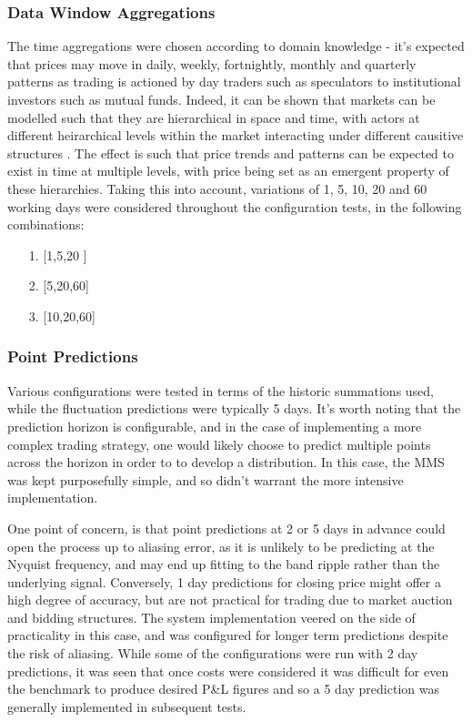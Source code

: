 \documentclass[a4paper,11pt,oneside]{article}
\theoremstyle{plain}
\theoremstyle{definition}
\begin{document}
\subsubsection{Data Window Aggregations} The time aggregations were chosen according to domain knowledge - it's expected that prices may move in daily, weekly, fortnightly, monthly and quarterly patterns as trading is actioned by day traders such as speculators to institutional investors such as mutual funds. Indeed, it can be shown that markets can be modelled such that they are hierarchical in space and time, with actors at different heirarchical levels within the market interacting under different causitive structures \cite{Wilcox}. The effect is such that price trends and patterns can be expected to exist in time at multiple levels, with price being set as an emergent property of these hierarchies. Taking this into account, variations of 1, 5, 10, 20 and 60 working days were considered throughout the configuration tests, in the following combinations:  
\begin{itemize}
	\item[1.] [1,5,20 ]
	\item[2.] [5,20,60]
	\item[3.] [10,20,60]
\end{itemize}

\subsubsection {Point Predictions} Various configurations were tested in terms of the historic summations used, while the fluctuation predictions were typically 5 days. It's worth noting that the prediction horizon is configurable, and in the case of implementing a more complex trading strategy, one would likely choose to predict multiple points across the horizon in order to to develop a distribution. In this case, the MMS was kept purposefully simple, and so didn't warrant the more intensive implementation. \newline

One point of concern, is that point predictions at 2 or 5 days in advance could open the process up to aliasing error, as it is unlikely to be predicting at the Nyquist frequency, and may end up fitting to the band ripple rather than the underlying signal. Conversely, 1 day predictions for closing price might offer a high degree of accuracy, but are not practical for trading due to market auction and bidding structures. The system implementation veered on the side of practicality in this case, and was configured for longer term predictions despite the risk of aliasing. While some of the configurations were run with 2 day predictions, it was seen that once costs were considered it was difficult for even the benchmark to produce desired P\&L figures and so a 5 day prediction was generally implemented in subsequent tests.
\end{document}
